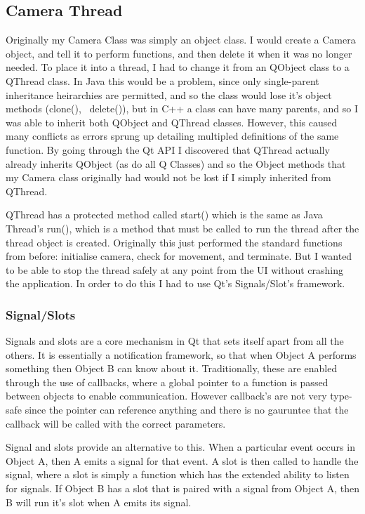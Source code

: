 \documentclass[11pt]{article} %
\begin{document}
\subsection{Camera Thread}
Originally my Camera Class was simply an object class. I would create a Camera object, and tell it to perform functions, and then delete it when it was no longer needed. To place it into a thread, I had to change it from an QObject class to a QThread class. In Java this would be a problem, since only single-parent inheritance heirarchies are permitted, and so the class would lose it's object methods (clone(), ~delete()), but in C++ a class can have many parents, and so I was able to inherit both QObject and QThread classes.
However, this caused many conflicts as errors sprung up detailing multipled definitions of the same function. By going through the Qt API I discovered that QThread actually already inherits QObject (as do all Q Classes) and so the Object methods that my Camera class originally had would not be lost if I simply inherited from QThread.

QThread has a protected method called start() which is the same as Java Thread's run(), which is a method that must be called to run the thread after the thread object is created. Originally this just performed the standard functions from before:  initialise camera, check for movement, and terminate. But I wanted to be able to stop the thread safely at any point from the UI without crashing the application. In order to do this I had to use Qt's Signals/Slot's framework.

\subsubsection{Signal/Slots}
Signals and slots are a core mechanism in Qt that sets itself apart from all the others. It is essentially a notification framework, so that when Object A performs something then Object B can know about it.  Traditionally, these are enabled through the use of callbacks, where a global pointer to a function is passed between objects to enable communication. However callback's are not very type-safe since the pointer can reference anything and there is no gauruntee that the callback will be called with the correct parameters.

Signal and slots provide an alternative to this. When a particular event occurs in Object A, then A emits a signal for that event. A slot  is then called to handle the signal, where a slot is simply a function which has the extended ability to listen for signals. If Object B has a slot that is paired with a signal from Object A, then  B will run it's slot when A emits its signal.
\end{document}
